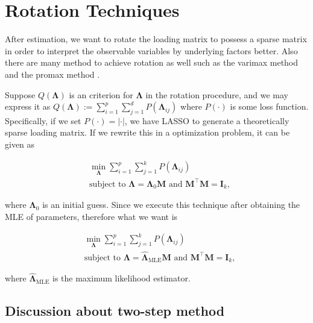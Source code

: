 \documentclass[
  a4paper,
  oneside,
  openany,
  12pt,
  onecolumn,
  twoside]{book}
\theoremstyle{plain}
\theoremstyle{remark}
\begin{document}
\section{Rotation Techniques}\label{rotation-techniques}

After estimation, we want to rotate the loading matrix to possess a
sparse matrix in order to interpret the observable variables by
underlying factors better. Also there are many method to achieve
rotation as well such as the varimax method and the promax method
\citep{hiroseSparseEstimationNonconcave2015}.

Suppose \(Q(\boldsymbol{\Lambda})\) is an criterion for
\(\boldsymbol{\Lambda}\) in the rotation procedure, and we may express
it as
\(Q(\boldsymbol{\Lambda}):= \sum^p_{i=1}\sum^d_{j=1}P(\boldsymbol{\Lambda}_{ij})\)
where \(P(\cdot)\) is some loss
function\citep{hiroseSparseEstimationNonconcave2015}. Specifically, if
we set \(P(\cdot)=|\cdot|\), we have LASSO to generate a theoretically
sparse loading matrix. If we rewrite this in a optimization problem, it
can be given as \citep{Jennrich2004Rotation}

\[
\begin{align*}
&\min_{\boldsymbol{\Lambda}} \sum^p_{i=1}\sum^k_{j=1}P(\boldsymbol{\Lambda}_{ij})\\
&\text{subject to } \boldsymbol{\Lambda}=\boldsymbol{\Lambda}_0\boldsymbol{M} \text{ and } \boldsymbol{M}^\top\boldsymbol{M}=\boldsymbol{I}_k,
\end{align*}
\]

where \(\boldsymbol{\Lambda}_0\) is an initial guess. Since we execute
this technique after obtaining the MLE of parameters, therefore what we
want is

\[
\begin{align*}
&\min_{\boldsymbol{\Lambda}} \sum^p_{i=1}\sum^k_{j=1}P(\boldsymbol{\Lambda}_{ij})\\
&\text{subject to } \boldsymbol{\Lambda}=\hat{\boldsymbol{\Lambda}}_{\text{MLE}}\boldsymbol{M} \text{ and } \boldsymbol{M}^\top\boldsymbol{M}=\boldsymbol{I}_k,
\end{align*}
\]

where \(\hat{\boldsymbol{\Lambda}}_{\text{MLE}}\) is the maximum
likelihood estimator.

\subsection{Discussion about two-step
method}\label{discussion-about-two-step-method}
\end{document}
